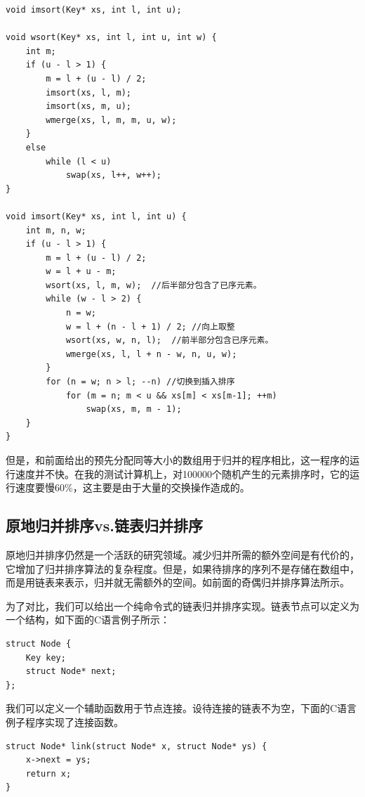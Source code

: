 \documentclass[b5paper]{ctexart}
\begin{document}
\lstset{language=C}
\begin{lstlisting}
void imsort(Key* xs, int l, int u);

void wsort(Key* xs, int l, int u, int w) {
    int m;
    if (u - l > 1) {
        m = l + (u - l) / 2;
        imsort(xs, l, m);
        imsort(xs, m, u);
        wmerge(xs, l, m, m, u, w);
    }
    else
        while (l < u)
            swap(xs, l++, w++);
}

void imsort(Key* xs, int l, int u) {
    int m, n, w;
    if (u - l > 1) {
        m = l + (u - l) / 2;
        w = l + u - m;
        wsort(xs, l, m, w);  //后半部分包含了已序元素。
        while (w - l > 2) {
            n = w;
            w = l + (n - l + 1) / 2; //向上取整
            wsort(xs, w, n, l);  //前半部分包含已序元素。
            wmerge(xs, l, l + n - w, n, u, w);
        }
        for (n = w; n > l; --n) //切换到插入排序
            for (m = n; m < u && xs[m] < xs[m-1]; ++m)
                swap(xs, m, m - 1);
    }
}
\end{lstlisting}

但是，和前面给出的预先分配同等大小的数组用于归并的程序相比，这一程序的运行速度并不快。在我的测试计算机上，对100000个随机产生的元素排序时，它的运行速度要慢60\%，这主要是由于大量的交换操作造成的。

\subsection{原地归并排序vs.链表归并排序}

原地归并排序仍然是一个活跃的研究领域。减少归并所需的额外空间是有代价的，它增加了归并排序算法的复杂程度。但是，如果待排序的序列不是存储在数组中，而是用链表来表示，归并就无需额外的空间。如前面的奇偶归并排序算法所示。

为了对比，我们可以给出一个纯命令式的链表归并排序实现。链表节点可以定义为一个结构，如下面的C语言例子所示：

\lstset{language=C}
\begin{lstlisting}
struct Node {
    Key key;
    struct Node* next;
};
\end{lstlisting}

我们可以定义一个辅助函数用于节点连接。设待连接的链表不为空，下面的C语言例子程序实现了连接函数。

\lstset{language=C}
\begin{lstlisting}
struct Node* link(struct Node* x, struct Node* ys) {
    x->next = ys;
    return x;
}
\end{lstlisting}
\end{document}
